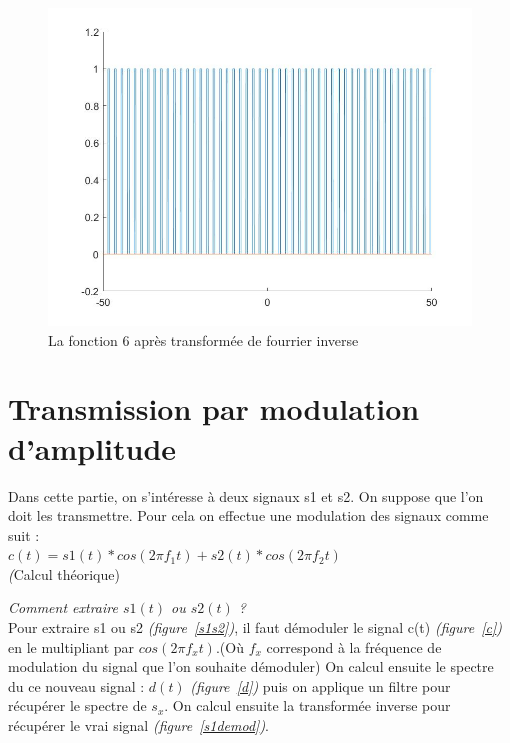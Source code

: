 \documentclass[10pt,a4paper]{article}
\begin{document}
\begin{figure}[H] \begin{center}
\includegraphics[scale=0.35]{fct6.jpg}
\caption{La fonction 6 après transformée de fourrier inverse}
\end{center} \end{figure}


\newpage
\bigskip
\section{Transmission par modulation d'amplitude}
Dans cette partie, on s'intéresse à deux signaux s1 et s2. On suppose que l'on doit les transmettre. Pour cela on effectue une modulation des signaux comme suit :\\
$c(t) = s1(t)*cos(2 \pi f_1 t)+ s2(t)*cos(2 \pi f_2 t)$\\
\textit(Calcul théorique)

\textit{Comment extraire $s1(t)$ ou $s2(t)$ ?}\\
Pour extraire s1 ou s2 \textit{(figure~\ref{s1s2})}, il faut démoduler le signal c(t) \textit{(figure~\ref{c})} en le multipliant par $cos(2 \pi f_x t)$.(Où $f_x$ correspond à la fréquence de modulation du signal que l'on souhaite démoduler) On calcul ensuite le spectre du ce nouveau signal : $d(t)$ \textit{(figure~\ref{d})} puis on applique un filtre pour récupérer le spectre de $s_x$. On calcul ensuite la transformée inverse pour récupérer le vrai signal \textit{(figure~\ref{s1demod})}.
\end{document}
